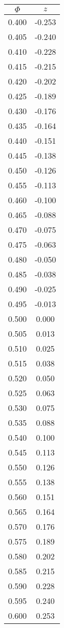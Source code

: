 \begin{tabular}{|c|c|}\hline
$\Phi$ & $z$ \\ \hline
0.400 & -0.253\\
0.405 & -0.240\\
0.410 & -0.228\\
0.415 & -0.215\\
0.420 & -0.202\\
0.425 & -0.189\\
0.430 & -0.176\\
0.435 & -0.164\\
0.440 & -0.151\\
0.445 & -0.138\\
0.450 & -0.126\\
0.455 & -0.113\\
0.460 & -0.100\\
0.465 & -0.088\\
0.470 & -0.075\\
0.475 & -0.063\\
0.480 & -0.050\\
0.485 & -0.038\\
0.490 & -0.025\\
0.495 & -0.013\\
0.500 & 0.000\\
0.505 & 0.013\\
0.510 & 0.025\\
0.515 & 0.038\\
0.520 & 0.050\\
0.525 & 0.063\\
0.530 & 0.075\\
0.535 & 0.088\\
0.540 & 0.100\\
0.545 & 0.113\\
0.550 & 0.126\\
0.555 & 0.138\\
0.560 & 0.151\\
0.565 & 0.164\\
0.570 & 0.176\\
0.575 & 0.189\\
0.580 & 0.202\\
0.585 & 0.215\\
0.590 & 0.228\\
0.595 & 0.240\\
0.600 & 0.253\\
\hline \end{tabular}

\columnbreak

